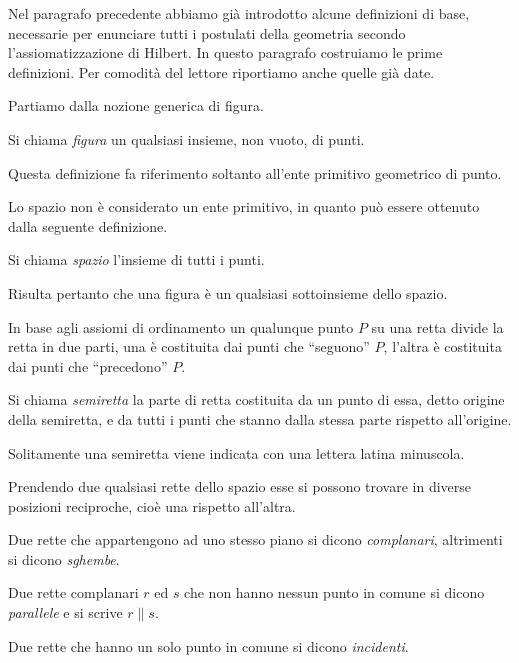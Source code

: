 Nel paragrafo precedente abbiamo già introdotto alcune definizioni di 
base, necessarie per enunciare tutti i postulati della geometria 
secondo l'assiomatizzazione di Hilbert. In questo paragrafo 
costruiamo le prime definizioni. Per comodità del lettore riportiamo 
anche quelle già date.

Partiamo dalla nozione generica di figura.
\begin{definizione}
Si chiama \emph{figura} un qualsiasi insieme, non vuoto, di punti.
\end{definizione}
Questa definizione fa riferimento soltanto all'ente primitivo 
geometrico di punto.

Lo spazio non è considerato un ente primitivo, in quanto può essere 
ottenuto dalla seguente definizione.
\begin{definizione}
Si chiama \emph{spazio} l'insieme di tutti i punti.
\end{definizione}
Risulta pertanto che una figura è un qualsiasi sottoinsieme dello 
spazio.

In base agli assiomi di ordinamento un qualunque punto $P$ su una 
retta divide la retta in due parti, una è costituita dai punti che 
``seguono'' $P$, l'altra è costituita dai punti che ``precedono'' $P$.
\begin{definizione}
Si chiama \emph{semiretta} la parte di retta costituita da un punto 
di essa, detto origine della semiretta, e da tutti i punti che stanno 
dalla stessa parte rispetto all'origine.
\end{definizione}
Solitamente una semiretta viene indicata con una lettera latina 
minuscola.

Prendendo due qualsiasi rette dello spazio esse si possono trovare in 
diverse posizioni reciproche, cioè una rispetto all'altra.
\begin{definizione}
Due rette che appartengono ad uno stesso piano si dicono 
\emph{complanari}, altrimenti si dicono \emph{sghembe}.
\end{definizione}

\begin{definizione}
Due rette complanari $r$ ed $s$ che non hanno nessun punto in comune 
si dicono \emph{parallele} e si scrive $r\parallel s$.
\end{definizione}

\begin{definizione}
Due rette che hanno un solo punto in comune si dicono 
\emph{incidenti}.
\end{definizione}

